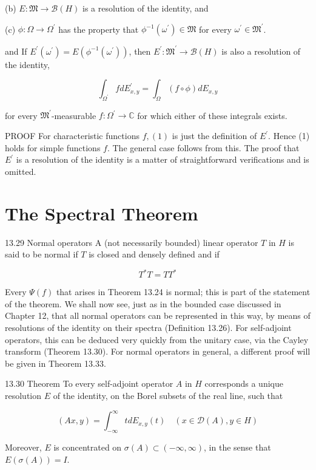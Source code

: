 \documentclass[10pt]{article}
\begin{document}
(b) $E: \mathfrak{M} \rightarrow \mathscr{B}(H)$ is a resolution of the identity, and

(c) $\phi: \Omega \rightarrow \Omega^{\prime}$ has the property that $\phi^{-1}\left(\omega^{\prime}\right) \in \mathfrak{M}$ for every $\omega^{\prime} \in \mathfrak{M}^{\prime}$.

and If $E^{\prime}\left(\omega^{\prime}\right)=E\left(\phi^{-1}\left(\omega^{\prime}\right)\right)$, then $E^{\prime}: \mathfrak{M}^{\prime} \rightarrow \mathscr{B}(H)$ is also a resolution of the identity,

$$
\int_{\Omega^{\prime}} f d E_{x, y}^{\prime}=\int_{\Omega}(f \circ \phi) d E_{x, y}
$$

for every $\mathfrak{M}^{\prime}$-measurable $f: \Omega^{\prime} \rightarrow \mathbb{C}$ for which either of these integrals exists.

PROOF For characteristic functions $f,(1)$ is just the definition of $E^{\prime}$. Hence (1) holds for simple functions $f$. The general case follows from this. The proof that $E^{\prime}$ is a resolution of the identity is a matter of straightforward verifications and is omitted.

\section{The Spectral Theorem}
13.29 Normal operators A (not necessarily bounded) linear operator $T$ in $H$ is said to be normal if $T$ is closed and densely defined and if

$$
T^{*} T=T T^{*}
$$

Every $\Psi(f)$ that arises in Theorem 13.24 is normal; this is part of the statement of the theorem. We shall now see, just as in the bounded case discussed in Chapter 12, that all normal operators can be represented in this way, by means of resolutions of the identity on their spectra (Definition 13.26). For self-adjoint operators, this can be deduced very quickly from the unitary case, via the Cayley transform (Theorem 13.30). For normal operators in general, a different proof will be given in Theorem 13.33.

13.30 Theorem To every self-adjoint operator $A$ in $H$ corresponds a unique resolution $E$ of the identity, on the Borel subsets of the real line, such that

$$
(A x, y)=\int_{-\infty}^{\infty} t d E_{x, y}(t) \quad(x \in \mathscr{D}(A), y \in H)
$$

Moreover, $E$ is concentrated on $\sigma(A) \subset(-\infty, \infty)$, in the sense that $E(\sigma(A))=I$.
\end{document}
